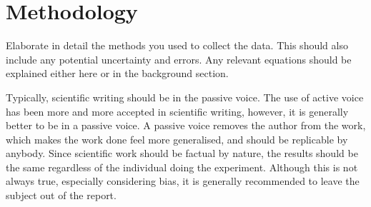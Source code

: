 \section{Methodology}
Elaborate in detail the methods you used to collect the data. This should also include any potential uncertainty and errors. 
Any relevant equations should be explained either here or in the background section. 

Typically, scientific writing should be in the passive voice. The use of active voice has been more and more accepted in scientific writing, however, it is generally better to be in a passive voice. 
A passive voice removes the author from the work, which makes the work done feel more generalised, and should be replicable by anybody. 
Since scientific work should be factual by nature, the results should be the same regardless of the individual doing the experiment. 
Although this is not always true, especially considering bias, it is generally recommended to leave the subject out of the report. 


